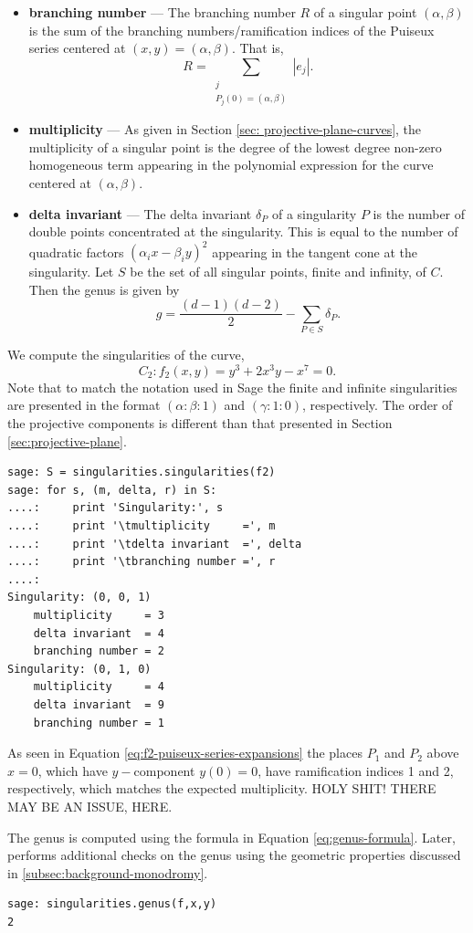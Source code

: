 \begin{itemize}
\item {\bf branching number} --- The branching number $R$ of a singular point
  $(\alpha, \beta)$ is the sum of the branching numbers/ramification indices of
  the Puiseux series centered at $(x,y) = (\alpha,\beta)$. That is,
  \begin{equation} \label{eq:branching-number}
    R = \!\!\!\! \sum_{\substack{j \\ P_j(0)=(\alpha,\beta)}} |e_j|.
  \end{equation}
\item {\bf multiplicity} --- As given in Section \ref{sec:
    projective-plane-curves}, the multiplicity of a singular point is the degree
  of the lowest degree non-zero homogeneous term appearing in the polynomial
  expression for the curve centered at $(\alpha, \beta)$.
\item {\bf delta invariant} --- The delta invariant $\delta_P$ of a singularity
  $P$ is the number of double points concentrated at the singularity. This is
  equal to the number of quadratic factors $(\alpha_i x - \beta_i y)^2$
  appearing in the tangent cone at the singularity. Let $S$ be the set of all
  singular points, finite and infinity, of $C$. Then the genus is given by
  \begin{equation} \label{eq:genus-formula}
    g = \frac{(d-1)(d-2)}{2} - \sum_{P \in S} \delta_P.
  \end{equation}
\end{itemize}

\begin{example}
  We compute the singularities of the curve,
\[
  C_2 : f_2(x,y) = y^3 + 2x^3y - x^7 = 0.
\]
Note that to match the notation used in Sage the finite and infinite
singularities are presented in the format $(\alpha : \beta : 1)$ and $(\gamma :
1 : 0)$, respectively. The order of the projective components is different than
that presented in Section \ref{sec:projective-plane}.
\begin{lstlisting}
sage: S = singularities.singularities(f2)
sage: for s, (m, delta, r) in S:
....:     print 'Singularity:', s
....:     print '\tmultiplicity     =', m
....:     print '\tdelta invariant  =', delta
....:     print '\tbranching number =', r
....:
Singularity: (0, 0, 1)
	multiplicity     = 3
	delta invariant  = 4
	branching number = 2
Singularity: (0, 1, 0)
	multiplicity     = 4
	delta invariant  = 9
	branching number = 1
\end{lstlisting}
As seen in Equation \eqref{eq:f2-puiseux-series-expansions} the places $P_1$ and
$P_2$ above $x=0$, which have $y-$component $y(0) = 0$, have ramification
indices 1 and 2, respectively, which matches the expected multiplicity. HOLY
SHIT! THERE MAY BE AN ISSUE, HERE.

The genus is computed using the formula in Equation \eqref{eq:genus-formula}.
Later, performs additional checks on the genus using the geometric properties
discussed in \ref{subsec:background-monodromy}.
\begin{lstlisting}
sage: singularities.genus(f,x,y)
2  
\end{lstlisting}
\end{example}

